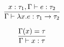 \documentclass{article}
\begin{document}
\pagestyle{empty}
\noindent
\renewcommand{\S}{\mathcal{S}}$$
\begin{array}{c}
\dfrac{x : \tau_1, \Gamma \vdash e : \tau_2}{\Gamma \vdash \lambda x.e : \tau_1 \rightarrow \tau_2}\bigskip\\
\dfrac{\Gamma(x) = \tau}{\Gamma \vdash x : \tau}
\end{array}
$$
\end{document}
